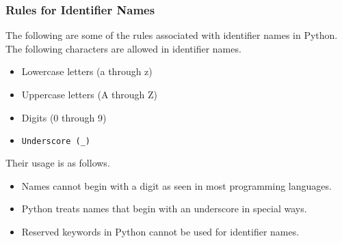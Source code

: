 \documentclass{beamer}
\begin{document}
\begin{frame}[fragile]
\frametitle{Rules for Identifier Names}
The following are some of the rules associated with identifier names in Python.
The following characters are allowed in identifier names.
\begin{itemize}
\item Lowercase letters (a through z)
\item Uppercase letters (A through Z)
\item Digits (0 through 9)
\item \begin{lstlisting}[language=Python]
Underscore (_)
\end{lstlisting}
\end{itemize}
Their usage is as follows.
\begin{itemize}
\item Names cannot begin with a digit as seen in most programming languages. 
\item Python treats names that begin with an underscore in special ways.
\item Reserved keywords in Python cannot be used for identifier names.
\end{itemize}
\end{frame}
\end{document}
